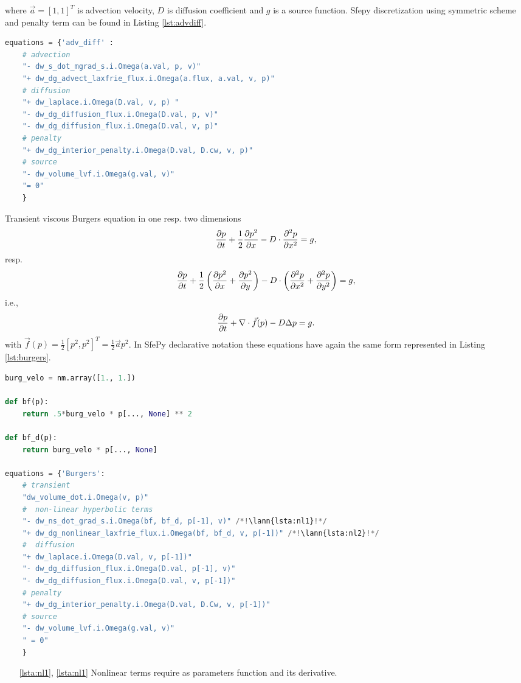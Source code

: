 where $\vec{a} = [1, 1]^T$ is advection velocity, $D$ is diffusion coefficient and $g$ is 
a source function. Sfepy discretization using symmetric scheme and penalty term can be 
found in Listing 
\ref{lst:advdiff}.
\setcounter{lstannotation}{0}
\begin{lstlisting}[language=Python, caption=Static advection-diffusion equation
\label{lst:advdiff}]
equations = {'adv_diff' :
	# advection
	"- dw_s_dot_mgrad_s.i.Omega(a.val, p, v)"
	"+ dw_dg_advect_laxfrie_flux.i.Omega(a.flux, a.val, v, p)"
	# diffusion
	"+ dw_laplace.i.Omega(D.val, v, p) "
	"- dw_dg_diffusion_flux.i.Omega(D.val, p, v)"
	"- dw_dg_diffusion_flux.i.Omega(D.val, v, p)"
	# penalty
	"+ dw_dg_interior_penalty.i.Omega(D.val, D.cw, v, p)"
	# source
	"- dw_volume_lvf.i.Omega(g.val, v)"
	"= 0"
	}
\end{lstlisting}
Transient viscous Burgers equation in one resp. two dimensions
\begin{equation}
\frac{\partial p}{\partial t} + \frac{1}{2}\frac{\partial p^2}{\partial x} - D \cdot\frac{\partial^2 p}{\partial x^2} = g,
\end{equation}
resp.
\begin{equation}
\label{eq:ex_burgers}
	\frac{\partial p}{\partial t} + \frac{1}{2}\left(\frac{\partial p^2}{\partial x} + \frac{\partial p^2}{\partial y}\right)  - 
	D \cdot \left( \frac{\partial^2 p}{\partial x^2} + \frac{\partial^2 p}{\partial y^2} \right) 
	= g,
\end{equation}
i.e.,
\begin{equation}
	\frac{\partial p}{\partial t} + \nabla \cdot \vec{f}(p) - D\Delta p = g.
\end{equation}
with $\vec{f}(p) = \frac{1}{2}[p^2, p^2]^T = \frac{1}{2}\vec{a} p^2$. In SfePy 
declarative notation these equations have again the same form represented in Listing 
\ref{lst:burgers}.
\setcounter{lstannotation}{0}
\begin{lstlisting}[language=Python, caption=Viscous Burgers equation \label{lst:burgers}]
burg_velo = nm.array([1., 1.])

def bf(p):
	return .5*burg_velo * p[..., None] ** 2

def bf_d(p):
	return burg_velo * p[..., None]

equations = {'Burgers':
	# transient
	"dw_volume_dot.i.Omega(v, p)"
	#  non-linear hyperbolic terms
	"- dw_ns_dot_grad_s.i.Omega(bf, bf_d, p[-1], v)" /*!\lann{lsta:nl1}!*/
	"+ dw_dg_nonlinear_laxfrie_flux.i.Omega(bf, bf_d, v, p[-1])" /*!\lann{lsta:nl2}!*/
	#  diffusion
	"+ dw_laplace.i.Omega(D.val, v, p[-1])"
	"- dw_dg_diffusion_flux.i.Omega(D.val, p[-1], v)"
	"- dw_dg_diffusion_flux.i.Omega(D.val, v, p[-1])"
	# penalty
	"+ dw_dg_interior_penalty.i.Omega(D.val, D.Cw, v, p[-1])"
	# source
	"- dw_volume_lvf.i.Omega(g.val, v)"
	" = 0"
	}
\end{lstlisting}
\begin{itemize}
	\item[\ref{lsta:nl1}, \ref{lsta:nl1}] Nonlinear terms require as parameters function 
	and its 
	derivative.
\end{itemize}
